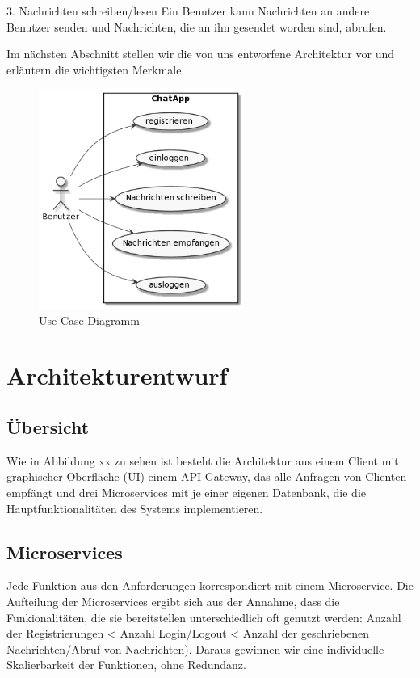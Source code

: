 3. Nachrichten schreiben/lesen
Ein Benutzer kann Nachrichten an andere Benutzer senden und Nachrichten, die an ihn gesendet worden sind, abrufen.


Im nächsten Abschnitt stellen wir die von uns entworfene Architektur vor und erläutern die wichtigsten Merkmale. 

\begin{figure}[bth] 
	\centering
	\includegraphics[width=0.6\textwidth]{Graphics/Usecase-Diagramm.png}
	\caption{Use-Case Diagramm}
\end{figure}

\section{Architekturentwurf}

\subsection{Übersicht}
Wie in Abbildung xx zu sehen ist besteht die Architektur aus einem Client mit graphischer Oberfläche (UI) einem API-Gateway, das alle Anfragen von Clienten empfängt und drei Microservices mit je einer eigenen Datenbank, die die Hauptfunktionalitäten des Systems implementieren.

\subsection{Microservices}
Jede Funktion aus den Anforderungen korrespondiert mit einem Microservice. Die Aufteilung der Microservices ergibt sich aus der Annahme, dass die Funkionalitäten, die sie bereitstellen unterschiedlich oft genutzt werden: Anzahl der Registrierungen < Anzahl Login/Logout < Anzahl der geschriebenen Nachrichten/Abruf von Nachrichten). Daraus gewinnen wir eine individuelle Skalierbarkeit der Funktionen, ohne Redundanz.

